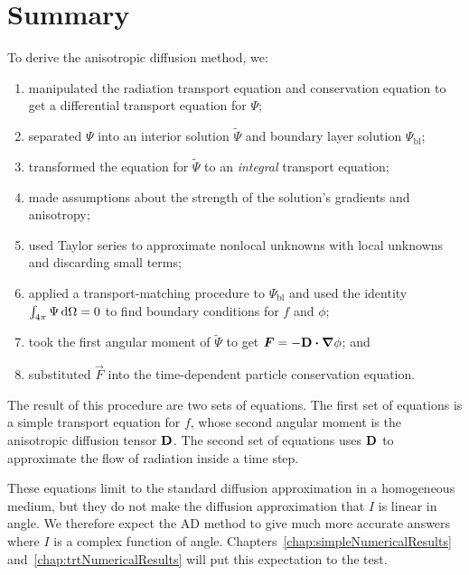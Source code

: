 \section{Summary}
To derive the anisotropic diffusion method, we:
\begin{enumerate}
  \item manipulated the radiation transport equation and conservation equation
    to get a differential transport equation for $\Psi$;
  \item separated $\Psi$ into an interior solution $\tilde \Psi$ and boundary
    layer solution $\Psi_\mathrm{bl}$;
  \item transformed the equation for $\tilde \Psi$ to an \emph{integral}
    transport equation;
  \item made assumptions about the strength of the solution's gradients and
    anisotropy;
  \item used Taylor series to approximate nonlocal unknowns with local
    unknowns and discarding small terms;
  \item applied a transport-matching procedure to $\Psi_\mathrm{bl}$ 
    and used the identity $\int_{4\pi} \Psi \mathop{}\!\mathrm{d}\Omega=0$ to find boundary
    conditions for $f$ and $\phi$;
  \item took the first angular moment of $\tilde \Psi$ to get
    $\bm{F}=-\mathbf{D} \bm{\cdot} \bm{\nabla} \phi$; and
  \item substituted $\vec{F}$ into the time-dependent particle conservation
    equation.
\end{enumerate}
The result of this procedure are two sets of equations. The first set of
equations is a simple transport equation for $f$, whose second angular moment is
the anisotropic diffusion tensor $\mathbf{D}$. The second set of equations uses
$\mathbf{D}$ to approximate the flow of radiation inside a time step. 

These equations limit to the standard diffusion approximation in a homogeneous
medium, but they do not make the diffusion approximation that $I$ is linear in
angle. We therefore expect the AD method to give much more accurate answers
where $I$ is a complex function of angle.
Chapters~\ref{chap:simpleNumericalResults}
and~\ref{chap:trtNumericalResults} will put this expectation to the test.

